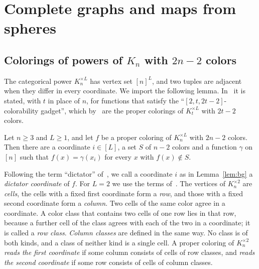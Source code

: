 \section{Complete graphs and maps from spheres}\label{sec:complete}

\subsection{Colorings of powers of \texorpdfstring{$K_n$}{Kn} with \texorpdfstring{$2n-2$}{2n-2} colors}\label{sec:dictator}

The categorical power $K_n^{\times L}$ has vertex set $[n]^L$, and two tuples are adjacent when they differ in every coordinate. We import the following lemma. In~\cite{BG} it is stated, with $t$ in place of $n$, for functions that satisfy the ``$[2,t,2t-2]$-colorability gadget'', which by~\cite[Proposition~2.4]{BG} are the proper colorings of $K_t^{\times L}$ with $2t-2$ colors.

\begin{lemma}\label{lem:bg}
Let $n\ge3$ and $L\ge1$, and let $f$ be a proper coloring of $K_n^{\times L}$ with $2n-2$ colors. Then there are a coordinate $i\in[L]$, a set $S$ of $n-2$ colors and a function $\gamma$ on $[n]$ such that $f(x)=\gamma(x_i)$ for every $x$ with $f(x)\notin S$.
\end{lemma}

Following the term ``dictator'' of~\cite{BG}, we call a coordinate $i$ as in Lemma~\ref{lem:bg} a \emph{dictator coordinate} of $f$. For $L=2$ we use the terms of~\cite[Section~2.4]{Z}. The vertices of $K_n^{\times2}$ are \emph{cells}, the cells with a fixed first coordinate form a \emph{row}, and those with a fixed second coordinate form a \emph{column}. Two cells of the same color agree in a coordinate. A color class that contains two cells of one row lies in that row, because a further cell of the class agrees with each of the two in a coordinate; it is called a \emph{row class}. \emph{Column classes} are defined in the same way. No class is of both kinds, and a class of neither kind is a single cell. A proper coloring of $K_n^{\times2}$ \emph{reads the first coordinate} if some column consists of cells of row classes, and \emph{reads the second coordinate} if some row consists of cells of column classes.

